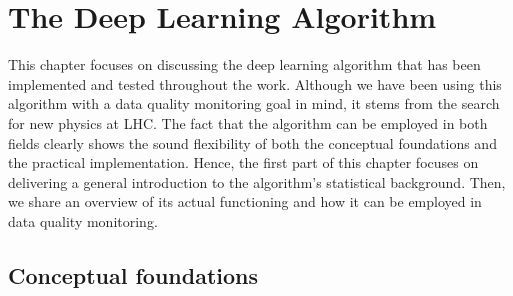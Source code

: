 \chapter{The Deep Learning Algorithm}
\label{chap:Algorithm}



This chapter focuses on discussing the deep learning algorithm that has been implemented and tested throughout the work.
Although we have been using this algorithm with a data quality monitoring goal in mind, it stems from the search for new
physics at LHC. The fact that the algorithm can be employed in both fields clearly shows the sound flexibility of both
the conceptual foundations and the practical implementation. Hence, the first part of this chapter focuses on delivering
a general introduction to the algorithm's statistical background. Then, we share an overview of its actual functioning
and how it can be employed in data quality monitoring.

\section{Conceptual foundations}






